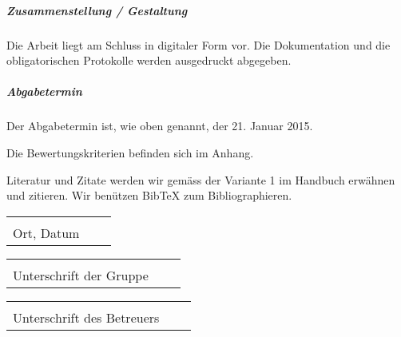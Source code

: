 \documentclass[parskip=half]{scrreprt}
\begin{document}
\begin{contract}
\subparagraph{Zusammenstellung / Gestaltung}
Die Arbeit liegt am Schluss in digitaler Form vor. Die Dokumentation und die obligatorischen Protokolle werden ausgedruckt abgegeben.

\subparagraph{Abgabetermin}
Der Abgabetermin ist, wie oben genannt, der 21. Januar 2015.


Die Bewertungskriterien befinden sich im Anhang.

Literatur und Zitate werden wir gemäss der Variante 1 im Handbuch erwähnen und zitieren.
Wir benützen BibTeX zum Bibliographieren.

\end{contract} 
  
\bigskip
\bigskip 
\bigskip
\bigskip  
\bigskip
\bigskip  
\bigskip
\bigskip
\bigskip
\bigskip 
\bigskip
\bigskip  
\bigskip
\bigskip  
\bigskip
\bigskip
\bigskip
\bigskip 
\bigskip
\bigskip  
\bigskip
\bigskip  
\bigskip
\bigskip
\bigskip
\bigskip 
\bigskip
\bigskip  
\bigskip
\bigskip  
\bigskip
\bigskip
\bigskip
\bigskip 
\bigskip
\bigskip  
\bigskip
\bigskip  
\bigskip
\bigskip

\vspace{1,5 cm} 
\begin{tabular}{p{7cm}p{.5cm}l}
\dotfill \\ 
Ort, Datum
\end{tabular}%

\vspace{1,5 cm} 
\begin{tabular}{p{10cm}p{.5cm}l}
\dotfill \\ 
Unterschrift der Gruppe 
\end{tabular}%
\hfill 
\begin{tabular}{p{5cm}p{.5cm}l}
\dotfill \\ 
Unterschrift des Betreuers
\end{tabular}%
  
\end{document}
